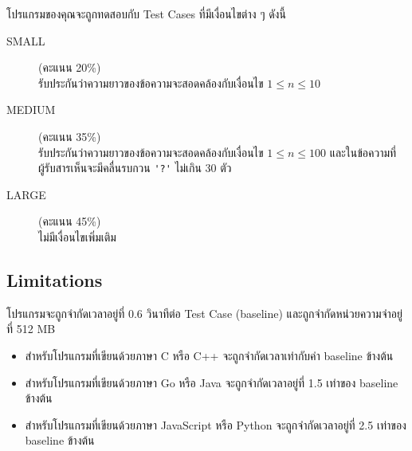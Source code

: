 \noindent
โปรแกรมของคุณจะถูกทดสอบกับ Test Cases ที่มีเงื่อนไขต่าง ๆ ดังนี้

\begin{description}
    \item[SMALL] (คะแนน 20\%) \\
        รับประกันว่าความยาวของข้อความจะสอดคล้องกับเงื่อนไข $1 \leq n \leq 10$
    \item[MEDIUM] (คะแนน 35\%) \\
        รับประกันว่าความยาวของข้อความจะสอดคล้องกับเงื่อนไข $1 \leq n \leq 100$ และในข้อความที่ผู้รับสารเห็นจะมีคลื่นรบกวน \lstinline{'?'} ไม่เกิน 30 ตัว
    \item[LARGE] (คะแนน 45\%) \\
        ไม่มีเงื่อนไขเพิ่มเติม
\end{description}


\subsection{Limitations}

\noindent
โปรแกรมจะถูกจำกัดเวลาอยู่ที่ 0.6 วินาทีต่อ Test Case (baseline) และถูกจำกัดหน่วยความจำอยู่ที่ 512 MB
\begin{itemize}
    \item 
        สำหรับโปรแกรมที่เขียนด้วยภาษา C หรือ C++ จะถูกจำกัดเวลาเท่ากับค่า baseline ข้างต้น
    \item 
        สำหรับโปรแกรมที่เขียนด้วยภาษา Go หรือ Java จะถูกจำกัดเวลาอยู่ที่ 1.5 เท่าของ baseline ข้างต้น
    \item 
        สำหรับโปรแกรมที่เขียนด้วยภาษา JavaScript หรือ Python จะถูกจำกัดเวลาอยู่ที่ 2.5 เท่าของ baseline ข้างต้น
\end{itemize}